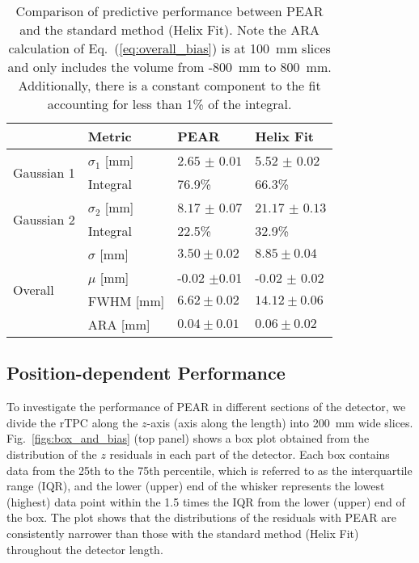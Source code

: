\documentclass[a4paper,11pt]{article}
\begin{document}
\begin{table}[h!]
    \centering
    \begin{tabular}{|l|l|l|l|}
        \hline & Metric & \textbf{PEAR} & \textbf{Helix Fit} \\ 
        \hline
        \multirow{2}{*}{Gaussian 1} & $\sigma_1$ [mm] & $2.65$ $\pm$ $0.01$ & 5.52 $\pm$ 0.02\\ 
        \cline{2-4} & Integral & 76.9\%& 66.3\%\\ 
        \hline
        \multirow{2}{*}{Gaussian 2} & $\sigma_2$ [mm] & $8.17$ $\pm$ $0.07$& $21.17$ $\pm$ $0.13$\\ 
        \cline{2-4} & Integral & 22.5\%& 32.9\%\\ 
        \hline
        \multirow{4}{*}{Overall}
        & $\sigma$ [mm] & $3.50 \pm 0.02$ & $8.85 \pm 0.04$ \\ \cline{2-4} 
        & $\mu$ [mm] & -0.02 $\pm $0.01& -0.02 $\pm$ 0.02\\
        \cline{2-4}
        & FWHM [mm] & $6.62 \pm 0.02$ & $14.12 \pm 0.06$\\ \cline{2-4} 
        & ARA [mm] & $0.04 \pm 0.01$ & $0.06 \pm 0.02$\\  \hline
    \end{tabular}
    \caption{\label{tab:res_results} Comparison of predictive performance between PEAR and the standard method (Helix Fit). Note the ARA calculation of Eq.~(\ref{eq:overall_bias}) is at 100~mm slices and only includes the volume from -800~mm to 800~mm. Additionally, there is a constant component to the fit accounting for less than 1\% of the integral.}
\end{table}

\subsection{Position-dependent Performance\label{subsec:pos_performance}}
To investigate the performance of PEAR in different sections of the detector, we divide the rTPC along the $z$-axis (axis along the length) into 200~mm wide slices. Fig.~\ref{figs:box_and_bias} (top panel) shows a box plot obtained from the distribution of the $z$ residuals in each part of the detector. Each box contains data from the 25th to the 75th percentile, which is referred to as the interquartile range (IQR), and the lower (upper) end of the whisker represents the lowest (highest) data point within the 1.5 times the IQR from the lower (upper) end of the box. The plot shows that the distributions of the residuals with PEAR are consistently narrower than those with the standard method (Helix Fit) throughout the detector length.
\end{document}

